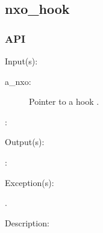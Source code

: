 %
%
%
%
%              

\subsection{nxo\_hook}
\label{nxo_hook}

\subsubsection{API}
\begin{capi}
\label{nxo_hook_}
	\begin{capilist}
	\item[Input(s): ]
		\begin{description}\item[]
		\item[a\_nxo: ]
			Pointer to a hook .
		\item[: ]
		\end{description}
	\item[Output(s): ]
		\begin{description}\item[]
		\item[: ]
		\end{description}
	\item[Exception(s): ]
		\begin{description}\item[]
		\item[.]
		\end{description}
	\item[Description: ]
	\end{capilist}
\end{capi}
